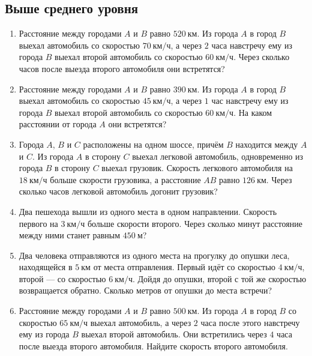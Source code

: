\documentclass[a4paper,12pt]{article}
\newcommand{\kmh}{\text{км/ч}}
\newcommand{\km}{\text{км}}
\newcommand{\m}{\text{м}}
\begin{document}
\subsection*{Выше среднего уровня}

\begin{enumerate}[resume]
    \item Расстояние между городами $A$ и $B$ равно $520\ \km$. Из города $A$ в город $B$ выехал автомобиль со скоростью $70\ \kmh$, а через $2$ часа навстречу ему из города $B$ выехал второй автомобиль со скоростью $60\ \kmh$. Через сколько часов после выезда второго автомобиля они встретятся?

    \item Расстояние между городами $A$ и $B$ равно $390\ \km$. Из города $A$ в город $B$ выехал автомобиль со скоростью $45\ \kmh$, а через $1$ час навстречу ему из города $B$ выехал второй автомобиль со скоростью $60\ \kmh$. На каком расстоянии от города $A$ они встретятся?

    \item Города $A$, $B$ и $C$ расположены на одном шоссе, причём $B$ находится между $A$ и $C$. Из города $A$ в сторону $C$ выехал легковой автомобиль, одновременно из города $B$ в сторону $C$ выехал грузовик. Скорость легкового автомобиля на $18\ \kmh$ больше скорости грузовика, а расстояние $AB$ равно $126\ \km$. Через сколько часов легковой автомобиль догонит грузовик?

    \item Два пешехода вышли из одного места в одном направлении. Скорость первого на $3\ \kmh$ больше скорости второго. Через сколько минут расстояние между ними станет равным $450\ \m$?

    \item Два человека отправляются из одного места на прогулку до опушки леса, находящейся в $5\ \km$ от места отправления. Первый идёт со скоростью $4\ \kmh$, второй --- со скоростью $6\ \kmh$. Дойдя до опушки, второй с той же скоростью возвращается обратно. Сколько метров от опушки до места встречи?

    \item Расстояние между городами $A$ и $B$ равно $500\ \km$. Из города $A$ в город $B$ со скоростью $65\ \kmh$ выехал автомобиль, а через $2$ часа после этого навстречу ему из города $B$ выехал второй автомобиль. Они встретились через $4$ часа после выезда второго автомобиля. Найдите скорость второго автомобиля.
\end{enumerate}
\end{document}

